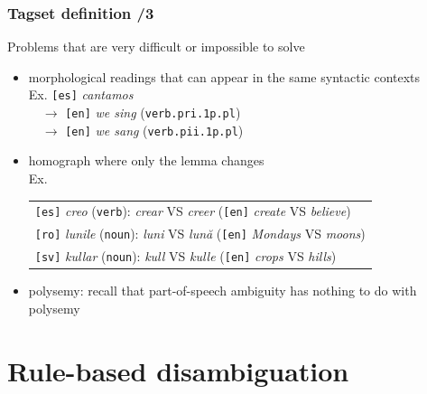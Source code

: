 \documentclass{beamer} %
\begin{document}
\begin{frame}
  \frametitle{Tagset definition /3} 

  \begin{block}{Problems that are very difficult or impossible to solve}
  \begin{itemize}
  \item morphological readings that can appear in the same syntactic contexts\\
    Ex. \texttt{[es]} \emph{cantamos}\\
    ~~$\rightarrow$ \texttt{[en]} \emph{we sing} (\texttt{verb.pri.1p.pl})\\
    ~~$\rightarrow$ \texttt{[en]} \emph{we sang} (\texttt{verb.pii.1p.pl})
  \item homograph where only the lemma changes\\
    Ex. 
    \begin{tabular}{l}
      \texttt{[es]} \emph{creo} (\texttt{verb}): \emph{crear} VS \emph{creer} {\footnotesize (\texttt{[en]} \emph{create} VS \emph{believe})}\\
      \texttt{[ro]} \emph{lunile} (\texttt{noun}): \emph{luni} VS \emph{lună} {\footnotesize (\texttt{[en]} \emph{Mondays} VS \emph{moons})}\\
      \texttt{[sv]} \emph{kullar} (\texttt{noun}): \emph{kull} VS \emph{kulle} {\footnotesize (\texttt{[en]} \emph{crops} VS \emph{hills})}\\
    \end{tabular}
  \item polysemy: recall that part-of-speech ambiguity has nothing to
    do with polysemy
  \end{itemize}
  \end{block}
\end{frame}

\section{Rule-based disambiguation}
\end{document}
